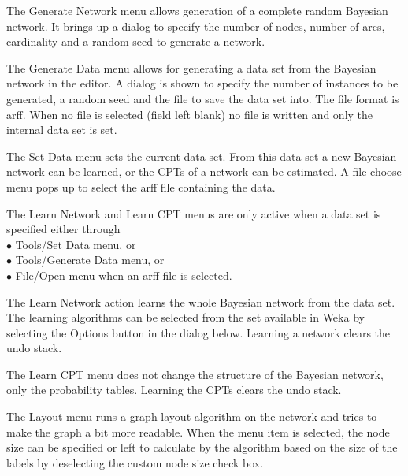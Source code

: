 The Generate Network menu allows generation of a complete random Bayesian 
network. It brings up a dialog to specify the number of nodes, number of
arcs, cardinality and a random seed to generate a network.

\begin{center}
\end{center}


The Generate Data menu allows for generating a data set from the Bayesian
network in the editor. A dialog is shown to specify the number of instances
to be generated, a random seed and the file to save the data set into. The
file format is arff. When no file is selected (field left blank) no file is 
written and only the internal data set is set.

\begin{center}
\end{center}

The Set Data menu sets the current data set. From this data set a new
Bayesian network can be learned, or the CPTs of a network can be estimated.
A file choose menu pops up to select the arff file containing the data.

The Learn Network and Learn CPT menus are only active when a data set is 
specified either through
\\$\bullet$ Tools/Set Data menu, or
\\$\bullet$ Tools/Generate Data menu, or
\\$\bullet$ File/Open menu when an arff file is selected.

The Learn Network action learns the whole Bayesian network from the data set.
The learning algorithms can be selected from the set available in Weka
by selecting the Options button in the dialog below.
Learning a network clears the undo stack.

\begin{center}
\end{center}

The Learn CPT menu does not change the structure of the Bayesian network,
only the probability tables.
Learning the CPTs clears the undo stack.

The Layout menu runs a graph layout algorithm on the network and tries to 
make the graph a bit more readable. When the menu item is selected, the node
size can be specified or left to calculate by the algorithm based on the size
of the labels by deselecting the custom node size check box.

